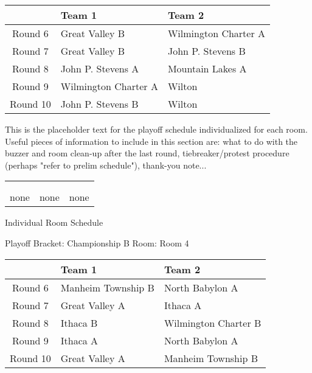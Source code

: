 \documentclass{article}%
\begin{document}
%
\begin{tabularx}{\textwidth}{|c|Y|Y|}%
\hline%
&Team 1&Team 2\\%
\hline%
Round 6&Great Valley B&Wilmington Charter A\\%
Round 7&Great Valley B&John P. Stevens B\\%
Round 8&John P. Stevens A&Mountain Lakes A\\%
Round 9&Wilmington Charter A&Wilton\\%
Round 10&John P. Stevens B&Wilton\\%
\hline%
\end{tabularx}%
\vspace*{16pt}%
\linebreak%
This is the placeholder text for the playoff schedule individualized for each room. Useful pieces of information to include in this section are: what to do with the buzzer and room clean{-}up after the last round, tiebreaker/protest procedure (perhaps "refer to prelim schedule"), thank{-}you note...%
\vspace*{30pt}%
\newline%
%
\begin{tabularx}{\textwidth}{YYY}%
  &  &  \\%
\\%
none&none&none\\%
\end{tabularx}%
\newpage%
\begin{center}%
\begin{Huge}%
Individual Room Schedule%
\end{Huge}%
\vspace*{16pt}%
\linebreak%
\begin{Large}%
Playoff Bracket: Championship B \hfill Room: Room 4%
\end{Large}%
\end{center}%
%
\begin{tabularx}{\textwidth}{|c|Y|Y|}%
\hline%
&Team 1&Team 2\\%
\hline%
Round 6&Manheim Township B&North Babylon A\\%
Round 7&Great Valley A&Ithaca A\\%
Round 8&Ithaca B&Wilmington Charter B\\%
Round 9&Ithaca A&North Babylon A\\%
Round 10&Great Valley A&Manheim Township B\\%
\hline%
\end{tabularx}%
\end{document}
